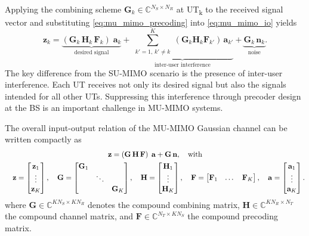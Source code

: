 Applying the combining scheme $\mathbf{G}_k \in \mathbb{C}^{N_S \times N_R}$ at \ac{UT}\textsubscript{k} to the received signal vector and substituting \eqref{eq:mu_mimo_precoding} into \eqref{eq:mu_mimo_io} yields
\begin{equation}
    \mathbf{z}_k 
    = \underbrace{\left(\mathbf{G}_k \, \mathbf{H}_k \, \mathbf{F}_k\right) \; \mathbf{a}_k}_{\text{desired signal}}
    + \underbrace{\sum_{\substack{k'=1, \, k'\neq k}}^{K} \left(\mathbf{G}_k \mathbf{H}_k \mathbf{F}_{k'}\right) \, \mathbf{a}_{k'}}_{\text{inter-user interference}} 
    + \underbrace{\mathbf{G}_k \, \mathbf{n}_k}_{\text{noise}}.
    \label{eq:mu_mimo_effective}
\end{equation}
The key difference from the \ac{SU}-\ac{MIMO} scenario is the presence of inter-user interference. Each \ac{UT} receives not only its desired signal but also the signals intended for all other \acp{UT}. Suppressing this interference through precoder design at the \ac{BS} is an important challenge in \ac{MU}-\ac{MIMO} systems.

The overall input-output relation of the \ac{MU}-\ac{MIMO} Gaussian channel can be written compactly as
\begin{gather}
    \mathbf{z} = \left(\mathbf{G} \, \mathbf{H} \, \mathbf{F}\right) \; \mathbf{a} + \mathbf{G} \, \mathbf{n}, \quad \text{with} \\
    \quad \mathbf{z} = \begin{bmatrix} \mathbf{z}_1 \\ \vdots \\ \mathbf{z}_K \end{bmatrix},
    \quad \mathbf{G} = \begin{bmatrix} \mathbf{G}_1 & & \\ & \ddots & \\ & & \mathbf{G}_K \end{bmatrix},
    \quad \mathbf{H} = \begin{bmatrix} \mathbf{H}_1 \\ \vdots \\ \mathbf{H}_K \end{bmatrix}, 
    \quad \mathbf{F} = \begin{bmatrix} \mathbf{F}_1 & \dots & \mathbf{F}_K \end{bmatrix}, 
    \quad \mathbf{a} = \begin{bmatrix} \mathbf{a}_1 \\ \vdots \\ \mathbf{a}_K \end{bmatrix}. \notag
\end{gather}
where $\mathbf{G} \in \mathbb{C}^{K N_S \times K N_R}$ denotes the compound combining matrix, $\mathbf{H} \in \mathbb{C}^{K N_R \times N_T}$ the compound channel matrix, and $\mathbf{F} \in \mathbb{C}^{N_T \times K N_S}$ the compound precoding matrix.


